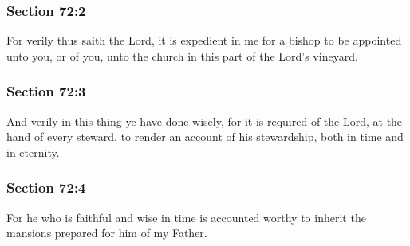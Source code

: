 	\subsubsection{Section 72:2} %
		\label{DC72-2}

		For verily thus saith the Lord, it is expedient in me for a bishop to be appointed unto you, or of you, unto the church in this part of the Lord's vineyard.


	\subsubsection{Section 72:3} %
		\label{DC72-3}

		And verily in this thing ye have done wisely, for it is required of the Lord, at the hand of every steward, to render an account of his stewardship, both in time and in eternity.


	\subsubsection{Section 72:4} %
		\label{DC72-4}

		For he who is faithful and wise in time is accounted worthy to inherit the mansions prepared for him of my Father.


